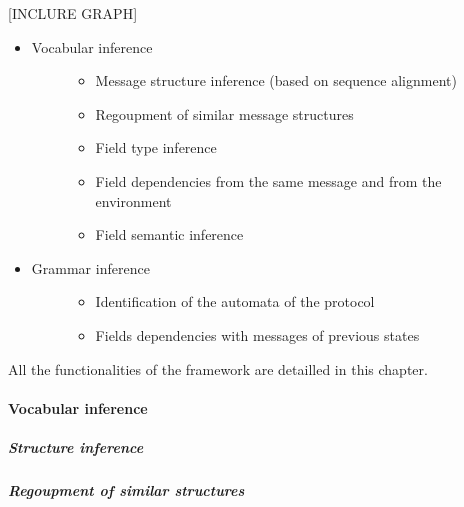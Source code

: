 \documentclass[letterpaper,10pt,english]{sphinxmanual}
\begin{document}
{[}INCLURE GRAPH{]}
\begin{itemize}
\item {} \begin{description}
\item[{Vocabular inference}] \leavevmode\begin{itemize}
\item {} 
Message structure inference (based on sequence alignment)

\item {} 
Regoupment of similar message structures

\item {} 
Field type inference

\item {} 
Field dependencies from the same message and from the environment

\item {} 
Field semantic inference

\end{itemize}

\end{description}

\item {} \begin{description}
\item[{Grammar inference}] \leavevmode\begin{itemize}
\item {} 
Identification of the automata of the protocol

\item {} 
Fields dependencies with messages of previous states

\end{itemize}

\end{description}

\end{itemize}

All the functionalities of the framework are detailled in this chapter.


\paragraph{Vocabular inference}
\label{modelization/vocabular::doc}\label{modelization/vocabular:vocabular-inference}\label{modelization/vocabular:vocabular}

\subparagraph{Structure inference}
\label{modelization/vocabular:structure-inference}

\subparagraph{Regoupment of similar structures}
\label{modelization/vocabular:regoupment-of-similar-structures}
\end{document}

